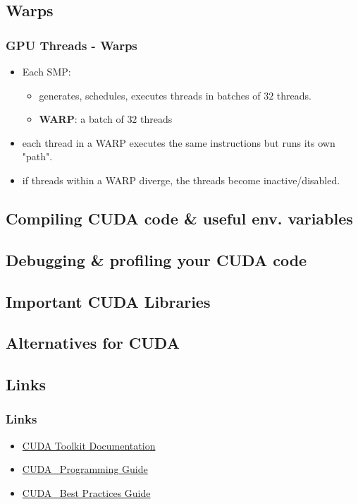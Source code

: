\subsection{Warps}
\begin{frame}
\frametitle{GPU Threads - Warps}
\begin{itemize}
  \item Each SMP:
  \begin{itemize}
     \item generates, schedules, executes threads in batches of $32$ threads.
     \item \textbf{WARP}: a batch of $32$ threads
  \end{itemize}
  \item each thread in a WARP executes the same instructions but runs its own "path".
  \item if threads within a WARP diverge, the threads become inactive/disabled.
\end{itemize}
\end{frame}


\subsection{Compiling CUDA code \& useful env. variables} 

\subsection{Debugging \& profiling your CUDA code}

\subsection{Important CUDA Libraries}

\subsection{Alternatives for CUDA}

\subsection{Links}
\begin{frame}
   \frametitle{Links}
      \begin{itemize}
	      \item \href{https://docs.nvidia.com/cuda/index.html}{CUDA Toolkit Documentation}
              \item \href{https://docs.nvidia.com/cuda/cuda-c-programming-guide/index.html}{CUDA \CC\, Programming Guide}
	      \item \href{https://docs.nvidia.com/cuda/cuda-c-best-practices-guide/index.html}{CUDA \CC\, Best Practices Guide}	      
      \end{itemize}		      
\end{frame}	

